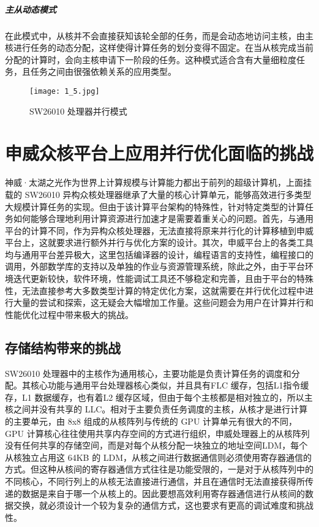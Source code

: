 \subparagraph{主从动态模式}
在此模式中，从核并不会直接获知该轮全部的任务，而是会动态地访问主核，由主核进行任务的动态分配，这样使得计算任务的划分变得不固定。在当从核完成当前分配的计算时，会向主核申请下一阶段的任务。这种模式适合含有大量细粒度任务，且任务之间由很强依赖关系的应用类型。

 \begin{figure}[h]
  \centering
  \texttt{[image: 1\_5.jpg]}
  \caption{SW26010 处理器并行模式}
\end{figure}

\section{申威众核平台上应用并行优化面临的挑战}
神威·太湖之光作为世界上计算规模与计算能力都出于前列的超级计算机，上面挂载的 SW26010 异构众核处理器继承了大量的核心计算单元，能够高效进行多类型大规模计算任务的实现。但由于该计算平台架构的特殊性，针对特定类型的计算任务如何能够合理地利用计算资源进行加速才是需要着重关心的问题。首先，与通用平台的计算不同，作为异构众核处理器，无法直接将原来并行化的计算移植到申威平台上，这就要求进行额外并行与优化方案的设计。其次，申威平台上的各类工具均与通用平台差异极大，这里包括编译器的设计，编程语言的支持性，编程接口的调用，外部数学库的支持以及单独的作业与资源管理系统，除此之外，由于平台环境迭代更新较快，软件环境，性能调试工具还不够稳定和完善，且由于平台的特殊性，无法直接参考大多数类型计算的特定优化方案，这就需要在并行优化过程中进行大量的尝试和探索，这无疑会大幅增加工作量。这些问题会为用户在计算并行和性能优化过程中带来极大的挑战。

\subsection{存储结构带来的挑战}
SW26010 处理器中的主核作为通用核心，主要功能是负责计算任务的调度和分配。其核心功能与通用平台处理器核心类似，并且具有FLC 缓存，包括L1指令缓存，L1 数据缓存，也有着L2 缓存区域，但由于每个主核都是相对独立的，所以主核之间并没有共享的 LLC。相对于主要负责任务调度的主核，从核才是进行计算的主要单元，由 8x8 组成的从核阵列与传统的 GPU 计算单元有很大的不同，GPU 计算核心往往使用共享内存空间的方式进行组织，申威处理器上的从核阵列没有任何共享的存储空间，而是对每个从核分配一块独立的地址空间LDM，每个从核独立占用这 64KB 的 LDM，从核之间进行数据通信则必须使用寄存器通信的方式。但这种从核间的寄存器通信方式往往是功能受限的，一是对于从核阵列中的不同核心，不同行列上的从核无法直接进行通信，并且在通信时无法直接获得所传递的数据是来自于哪一个从核上的。因此要想高效利用寄存器通信进行从核间的数据交换，就必须设计一个较为复杂的通信方式，这也要求有更高的调试难度和挑战性。

